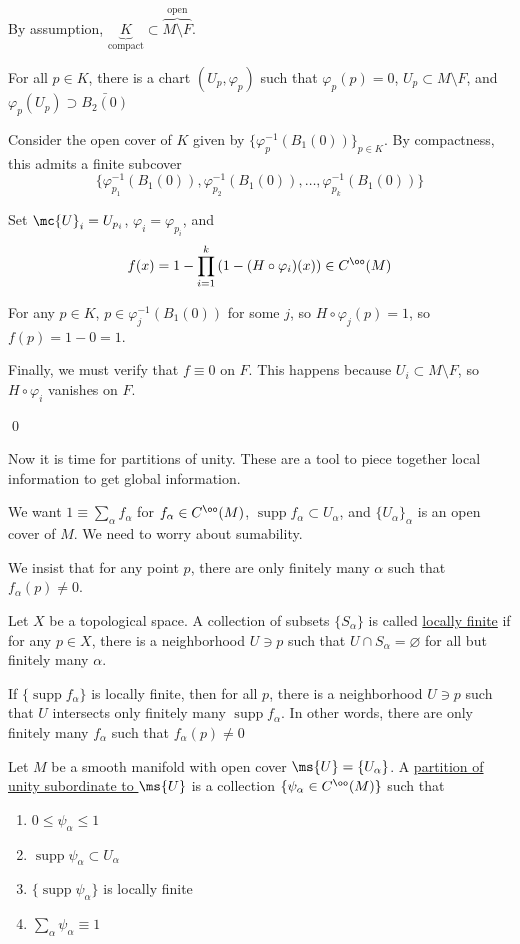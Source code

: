 \documentclass[x11names,reqno,14pt]{extarticle}
\renewcommand{\phi}{\varphi}
\DeclareMathOperator{\supp}{supp}
\begin{document}
\proof

By assumption, $\underbrace{K}_{\text{compact}} \subset \overbrace{M \setminus F}^{\text{open}}$. 

For all $p \in K$, there is a chart $(U_p, \phi_p)$ such that $\phi_p(p) = 0$, $U_p \subset M \setminus F$, and $\phi_p(U_p) \supset \bar{B_2(0)}$

Consider the open cover of $K$ given by $\{\phi_p^{-1}(B_1(0))\}_{p\in K}$. By compactness, this admits a finite subcover
\[
\{\phi_{p_1}^{-1}(B_1(0)), \phi_{p_2}^{-1}(B_1(0)), \dots, \phi_{p_k}^{-1}(B_1(0))\}
\]

Set $\mc{U}_i = U_{p_i}$, $\phi_i = \phi_{p_i}$, and
\[
f(x) = 1 - \prod_{i=1}^k\left(1 - (H\circ\phi_i)(x)\right) \in C^\oo(M)
\]

For any $p \in K$, $p \in \phi_j^{-1}(B_1(0))$ for some $j$, so $H\circ\phi_j(p) = 1$, so $f(p) = 1 - 0 = 1$. 

Finally, we must verify that $f \equiv 0$ on $F$. This happens because $U_i \subset M \setminus F$, so $H\circ\phi_i$ vanishes on $F$. 

\qed

Now it is time for partitions of unity. These are a tool to piece together local information to get global information. 

We want $1 \equiv \sum_\alpha f_\alpha$ for $f_\alpha \in C^\oo(M)$, $\supp f_\alpha \subset U_\alpha$, and $\{U_\alpha\}_\alpha$ is an open cover of $M$. We need to worry about sumability. 

We insist that for any point $p$, there are only finitely many $\alpha$ such that $f_\alpha(p)\neq0$.


Let $X$ be a topological space. A collection of subsets $\{S_\alpha\}$ is called \underline{locally finite} if for any $p \in X$, there is a neighborhood $U \ni p$ such that $U \cap S_\alpha = \varnothing$ for all but finitely many $\alpha$. 

\exm

If $\{\supp f_\alpha\}$ is locally finite, then for all $p$, there is a neighborhood $U\ni p$ such that $U$ intersects only finitely many $\supp f_\alpha$. In other words, there are only finitely many $f_\alpha$ such that $f_\alpha(p)\neq0$


Let $M$ be a smooth manifold with open cover $\ms{U} = \{U_\alpha\}$. A \underline{partition of unity subordinate to $\ms{U}$} is a collection $\{\psi_\alpha\in C^\oo(M)\}$ such that
\begin{enumerate}[label=(\roman*)]

\item $0\leq\psi_\alpha\leq1$

\item $\supp\psi_\alpha\subset U_\alpha$

\item $\{\supp\psi_\alpha\}$ is locally finite

\item $\sum_\alpha\psi_\alpha \equiv 1$

\end{enumerate}
\end{document}
